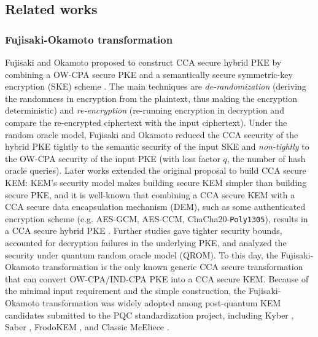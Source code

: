 \documentclass[runningheads]{llncs}
\begin{document}

\subsection{Related works}\label{sec:related-works}
\subsubsection{Fujisaki-Okamoto transformation}
Fujisaki and Okamoto proposed to construct CCA secure hybrid PKE by combining a OW-CPA secure PKE and a semantically secure symmetric-key encryption (SKE) scheme \cite{DBLP:conf/crypto/FujisakiO99}. The main techniques are \textit{de-randomization} (deriving the randomness in encryption from the plaintext, thus making the encryption deterministic) and \textit{re-encryption} (re-running encryption in decryption and compare the re-encrypted ciphertext with the input ciphertext). Under the random oracle model, Fujisaki and Okamoto reduced the CCA security of the hybrid PKE tightly to the semantic security of the input SKE and \textit{non-tightly} to the OW-CPA security of the input PKE (with loss factor $q$, the number of hash oracle queries). Later works extended the original proposal to build CCA secure KEM: KEM's security model makes building secure KEM simpler than building secure PKE, and it is well-known that combining a CCA secure KEM with a CCA secure data encapsulation mechanism (DEM), such as some authenticated encryption scheme (e.g. AES-GCM, AES-CCM, ChaCha20-\texttt{Poly1305}), results in a CCA secure hybrid PKE \cite{DBLP:journals/iacr/Shoup01,DBLP:conf/eurocrypt/Shoup00a}. Further studies \cite{DBLP:conf/ima/Dent03,DBLP:conf/tcc/HofheinzHK17,DBLP:journals/iacr/BernsteinP18,DBLP:conf/asiacrypt/HovelmannsHM22,DBLP:conf/pqcrypto/XagawaY19,DBLP:conf/crypto/JiangZCWM18} gave tighter security bounds, accounted for decryption failures in the underlying PKE, and analyzed the security under quantum random oracle model (QROM). To this day, the Fujisaki-Okamoto transformation is the only known generic CCA secure transformation that can convert OW-CPA/IND-CPA PKE into a CCA secure KEM. Because of the minimal input requirement and the simple construction, the Fujisaki-Okamoto transformation was widely adopted among post-quantum KEM candidates submitted to the PQC standardization project, including Kyber \cite{DBLP:conf/eurosp/BosDKLLSSSS18}, Saber \cite{DBLP:conf/africacrypt/DAnversKRV18}, FrodoKEM \cite{DBLP:conf/ccs/BosCDMNNRS16}, and Classic McEliece \cite{ClassicMcEliece2022}.
\end{document}
